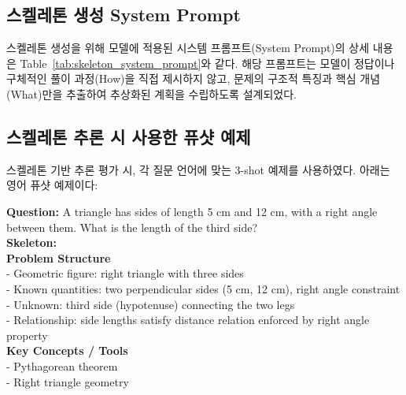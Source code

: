\subsection{스켈레톤 생성 System Prompt}

스켈레톤 생성을 위해 모델에 적용된 시스템 프롬프트(System Prompt)의 상세 내용은 Table~\ref{tab:skeleton_system_prompt}와 같다. 해당 프롬프트는 모델이 정답이나 구체적인 풀이 과정(How)을 직접 제시하지 않고, 문제의 구조적 특징과 핵심 개념(What)만을 추출하여 추상화된 계획을 수립하도록 설계되었다.



\subsection{스켈레톤 추론 시 사용한 퓨샷 예제}

스켈레톤 기반 추론 평가 시, 각 질문 언어에 맞는 3-shot 예제를 사용하였다. 아래는 영어 퓨샷 예제이다:

\begin{tcolorbox}[
  colback=blue!3,
  colframe=blue!50!black,
  boxrule=0.5pt,
  arc=4pt,
  left=6pt,
  right=6pt,
  top=4pt,
  bottom=4pt,
  title=Few-shot Example 1: Geometry
]
\small
\textbf{Question:} A triangle has sides of length 5 cm and 12 cm, with a right angle between them. What is the length of the third side?\\[0.5em]

\textbf{Skeleton:}\\
\textbf{Problem Structure}\\
- Geometric figure: right triangle with three sides\\
- Known quantities: two perpendicular sides (5 cm, 12 cm), right angle constraint\\
- Unknown: third side (hypotenuse) connecting the two legs\\
- Relationship: side lengths satisfy distance relation enforced by right angle property\\[0.3em]
\textbf{Key Concepts / Tools}\\
- Pythagorean theorem\\
- Right triangle geometry
\end{tcolorbox}

